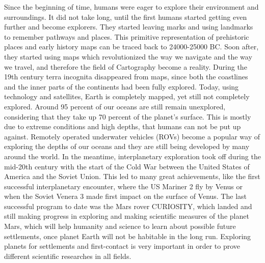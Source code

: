 Since the beginning of time, humans were eager to explore their environment and surroundings. It did not take long, until the first humans started getting even further and become explorers. They started leaving marks and using landmarks to remember pathways and places. This primitive representation of prehistoric places and early history maps can be traced back to 24000-25000 BC. Soon after, they started using maps which revolutionized the way we navigate and the way we travel, and therefore the field of Cartography become a reality. During the 19th century terra incognita disappeared from maps, since both the coastlines and the inner parts of the continents had been fully explored. Today, using technology and satellites, Earth is completely mapped, yet still not completely explored. Around 95 percent of our oceans are still remain unexplored, considering that they take up 70 percent of the planet's surface. This is mostly due to extreme conditions and high depths, that humans can not be put up against. Remotely operated underwater vehicles (ROVs) become a popular way of exploring the depths of our oceans and they are still being developed by many around the world. In the meantime, interplanetary exploration took off during the mid-20th century with the start of the Cold War between the United States of America and the Soviet Union. This led to many great achievements, like the first successful interplanetary encounter, where the US Mariner 2 fly by Venus or when the Soviet Venera 3 made first impact on the surface of Venus. The last successful program to date was the Mars rover CURIOSITY, which landed and still making progress in exploring and making scientific measures of the planet Mars, which will help humanity and science to learn about possible future settlements, once planet Earth will not be habitable in the long run. Exploring planets for settlements and first-contact is very important in order to prove different scientific researches in all fields.

